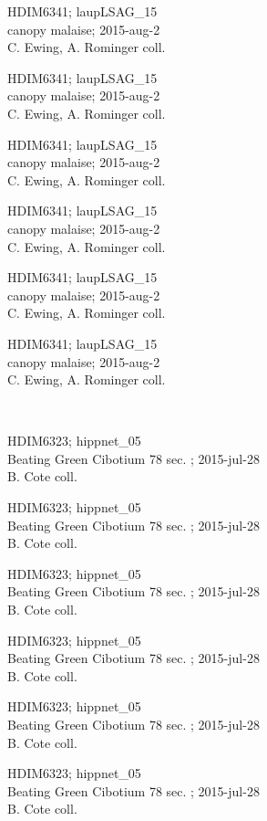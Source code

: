 \documentclass[2pt]{extarticle}
\begin{document}
\noindent
\parbox{0.16\textwidth}{\tiny \raggedright \rule[-0.3\baselineskip]{0pt}{10pt}HDIM6341; laupLSAG\_15\\ canopy malaise; 2015-aug-2\\ C. Ewing, A. Rominger coll.}
\parbox{0.16\textwidth}{\tiny \raggedright \rule[-0.3\baselineskip]{0pt}{10pt}HDIM6341; laupLSAG\_15\\ canopy malaise; 2015-aug-2\\ C. Ewing, A. Rominger coll.}
\parbox{0.16\textwidth}{\tiny \raggedright \rule[-0.3\baselineskip]{0pt}{10pt}HDIM6341; laupLSAG\_15\\ canopy malaise; 2015-aug-2\\ C. Ewing, A. Rominger coll.}
\parbox{0.16\textwidth}{\tiny \raggedright \rule[-0.3\baselineskip]{0pt}{10pt}HDIM6341; laupLSAG\_15\\ canopy malaise; 2015-aug-2\\ C. Ewing, A. Rominger coll.}
\parbox{0.16\textwidth}{\tiny \raggedright \rule[-0.3\baselineskip]{0pt}{10pt}HDIM6341; laupLSAG\_15\\ canopy malaise; 2015-aug-2\\ C. Ewing, A. Rominger coll.}
\parbox{0.16\textwidth}{\tiny \raggedright \rule[-0.3\baselineskip]{0pt}{10pt}HDIM6341; laupLSAG\_15\\ canopy malaise; 2015-aug-2\\ C. Ewing, A. Rominger coll.} \\ 
\vspace{0.001in} 

\noindent
\parbox{0.16\textwidth}{\tiny \raggedright \rule[-0.3\baselineskip]{0pt}{10pt}HDIM6323; hippnet\_05\\ Beating Green Cibotium 78 sec. ; 2015-jul-28\\ B. Cote coll.}
\parbox{0.16\textwidth}{\tiny \raggedright \rule[-0.3\baselineskip]{0pt}{10pt}HDIM6323; hippnet\_05\\ Beating Green Cibotium 78 sec. ; 2015-jul-28\\ B. Cote coll.}
\parbox{0.16\textwidth}{\tiny \raggedright \rule[-0.3\baselineskip]{0pt}{10pt}HDIM6323; hippnet\_05\\ Beating Green Cibotium 78 sec. ; 2015-jul-28\\ B. Cote coll.}
\parbox{0.16\textwidth}{\tiny \raggedright \rule[-0.3\baselineskip]{0pt}{10pt}HDIM6323; hippnet\_05\\ Beating Green Cibotium 78 sec. ; 2015-jul-28\\ B. Cote coll.}
\parbox{0.16\textwidth}{\tiny \raggedright \rule[-0.3\baselineskip]{0pt}{10pt}HDIM6323; hippnet\_05\\ Beating Green Cibotium 78 sec. ; 2015-jul-28\\ B. Cote coll.}
\parbox{0.16\textwidth}{\tiny \raggedright \rule[-0.3\baselineskip]{0pt}{10pt}HDIM6323; hippnet\_05\\ Beating Green Cibotium 78 sec. ; 2015-jul-28\\ B. Cote coll.} \\ 
\vspace{0.001in} 
\end{document}
